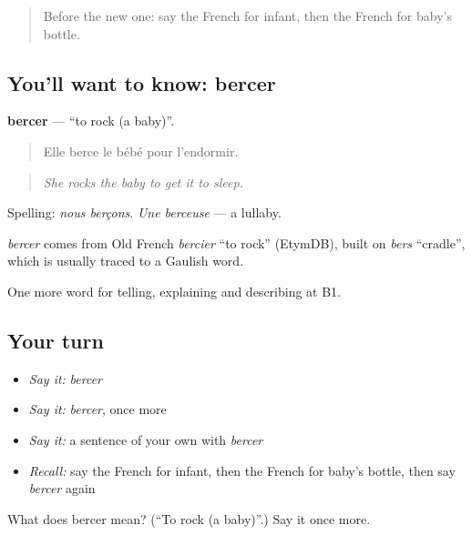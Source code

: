 \label{lesson:FR-C493-bercer}



\begin{quote}
Before the new one: say the French for infant, then the French for baby's bottle.
\end{quote}

\subsection*{You'll want to know: bercer}
\textbf{bercer} — \textquotedblleft{}to rock (a baby)\textquotedblright{}.

\begin{quote}
Elle berce le bébé pour l'endormir.
\end{quote}

\begin{quote}
\emph{She rocks the baby to get it to sleep.}
\end{quote}

Spelling: \emph{nous berçons}. \emph{Une berceuse} — a lullaby.

\begin{cousinweb}
\emph{bercer} comes from Old French \emph{bercier} \textquotedblleft{}to rock\textquotedblright{} (EtymDB), built on \emph{bers} \textquotedblleft{}cradle\textquotedblright{}, which is usually traced to a Gaulish word.
\end{cousinweb}

\begin{grammarlens}[title={What you've built}]
One more word for telling, explaining and describing at B1.
\end{grammarlens}

\subsection*{Your turn}
\begin{itemize}
\raggedright
  \item \emph{Say it:} \emph{bercer}
  \item \emph{Say it:} \emph{bercer}, once more
  \item \emph{Say it:} a sentence of your own with \emph{bercer}
  \item \emph{Recall:} say the French for infant, then the French for baby's bottle, then say \emph{bercer} again
\end{itemize}

\begin{tcolorbox}[breakable,colback=teal!4,colframe=teal!35!black,title={Before you move on}]
What does bercer mean? (\textquotedblleft{}To rock (a baby)\textquotedblright{}.) Say it once more.
\end{tcolorbox}
